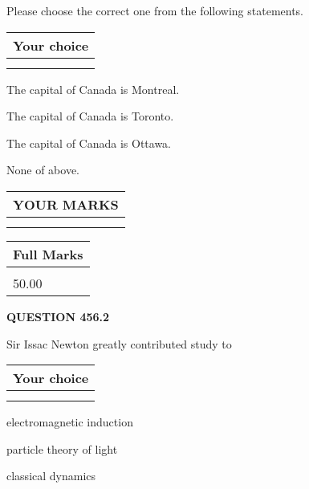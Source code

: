 \documentclass[12pt]{article}
\begin{document}
  
Please choose the correct one from the following statements.
  
  
\noindent\hspace{3.0in} \begin{tabular}{|l|}
\hline
Your choice \\
\hline
 \\ 
 \\ 
\hline
\end{tabular}
  
  
 
 
The capital of Canada is Montreal.
 
 
The capital of Canada is Toronto.
 
 
The capital of Canada is Ottawa.
 
 
 None of above.
 
 
  
\vspace{0.2in}
  
\noindent\begin{tabular}{|l|}
\hline
 YOUR MARKS  \\
\hline
 \\ 
 \\ 
\hline
\end{tabular}
\hspace{0.05in} \begin{tabular}{|l|}
\hline
 Full Marks  \\
\hline
 \\ 
50.00 \\
\hline
\end{tabular}
{\textbf{\Large{QUESTION
456.2 
}}}
  
  
Sir Issac Newton greatly contributed study to
  
  
\noindent\hspace{3.0in} \begin{tabular}{|l|}
\hline
Your choice \\
\hline
 \\ 
 \\ 
\hline
\end{tabular}
  
  
 
 
electromagnetic induction
 
 
particle theory of light
 
 
classical dynamics
 
\end{document}

